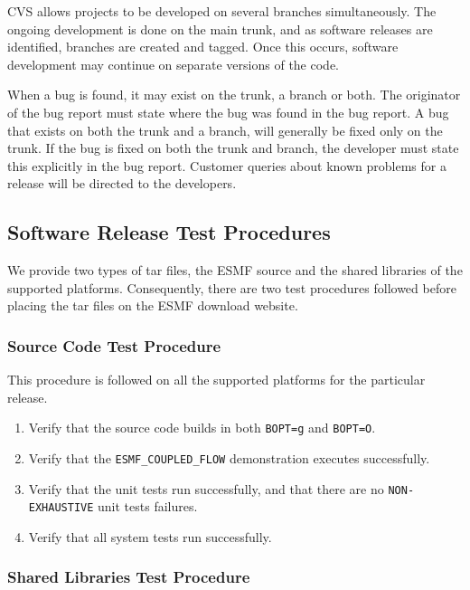 CVS allows projects to be developed on several branches simultaneously. The ongoing development
is done on the main trunk, and as software releases are identified, branches are created and tagged. Once this
occurs, software development may continue on separate versions of the code. 

When a bug is found, it may exist on the trunk, a branch or both. The originator of the bug report
must state where the bug was found in the bug report.  A bug that exists on both the trunk and a 
branch, will generally be fixed only on the trunk. If the bug is fixed on both the trunk and branch, the 
developer must state this explicitly in the bug report.  Customer queries about known problems for a 
release will be directed to the developers.



\subsection{Software Release Test Procedures}

We provide two types of tar files, the ESMF source and the shared libraries of 
the supported platforms. Consequently, there are two test procedures followed before placing the 
tar files on the ESMF download website. 

\subsubsection{Source Code Test Procedure}

This procedure is followed on all the supported platforms for the particular release.

\begin{enumerate}
\item Verify that the source code builds in both {\tt BOPT=g} and {\tt BOPT=O}.
\item Verify that  the {\tt ESMF\_COUPLED\_FLOW} demonstration executes successfully.
\item Verify that the unit tests run successfully, and that there are no {\tt NON-EXHAUSTIVE} unit tests  failures.
\item Verify that all system tests run successfully. 
\end{enumerate}


\subsubsection{Shared Libraries Test Procedure}

